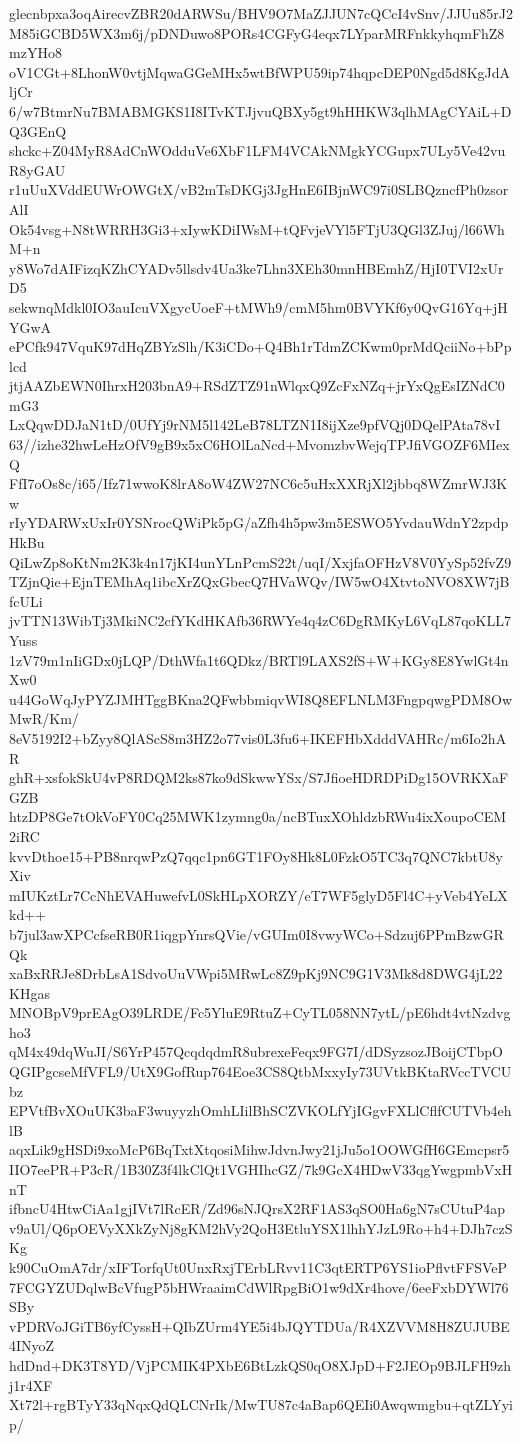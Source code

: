 glecnbpxa3oqAirecvZBR20dARWSu/BHV9O7MaZJJUN7cQCcI4vSnv/JJUu85rJ2
M85iGCBD5WX3m6j/pDNDuwo8PORs4CGFyG4eqx7LYparMRFnkkyhqmFhZ8mzYHo8
oV1CGt+8LhonW0vtjMqwaGGeMHx5wtBfWPU59ip74hqpcDEP0Ngd5d8KgJdAljCr
6/w7BtmrNu7BMABMGKS1I8ITvKTJjvuQBXy5gt9hHHKW3qlhMAgCYAiL+DQ3GEnQ
shckc+Z04MyR8AdCnWOdduVe6XbF1LFM4VCAkNMgkYCGupx7ULy5Ve42vuR8yGAU
r1uUuXVddEUWrOWGtX/vB2mTsDKGj3JgHnE6IBjnWC97i0SLBQzncfPh0zsorAlI
Ok54vsg+N8tWRRH3Gi3+xIywKDiIWsM+tQFvjeVYl5FTjU3QGl3ZJuj/l66WhM+n
y8Wo7dAIFizqKZhCYADv5llsdv4Ua3ke7Lhn3XEh30mnHBEmhZ/HjI0TVI2xUrD5
sekwnqMdkl0IO3auIcuVXgycUoeF+tMWh9/cmM5hm0BVYKf6y0QvG16Yq+jHYGwA
ePCfk947VquK97dHqZBYzSlh/K3iCDo+Q4Bh1rTdmZCKwm0prMdQciiNo+bPplcd
jtjAAZbEWN0IhrxH203bnA9+RSdZTZ91nWlqxQ9ZcFxNZq+jrYxQgEsIZNdC0mG3
LxQqwDDJaN1tD/0UfYj9rNM5l142LeB78LTZN1I8ijXze9pfVQj0DQelPAta78vI
63//izhe32hwLeHzOfV9gB9x5xC6HOlLaNcd+MvomzbvWejqTPJfiVGOZF6MIexQ
FfI7oOs8c/i65/Ifz71wwoK8lrA8oW4ZW27NC6c5uHxXXRjXl2jbbq8WZmrWJ3Kw
rIyYDARWxUxIr0YSNrocQWiPk5pG/aZfh4h5pw3m5ESWO5YvdauWdnY2zpdpHkBu
QiLwZp8oKtNm2K3k4n17jKI4unYLnPcmS22t/uqI/XxjfaOFHzV8V0YySp52fvZ9
TZjnQie+EjnTEMhAq1ibcXrZQxGbecQ7HVaWQv/IW5wO4XtvtoNVO8XW7jBfcULi
jvTTN13WibTj3MkiNC2cfYKdHKAfb36RWYe4q4zC6DgRMKyL6VqL87qoKLL7Yuss
1zV79m1nIiGDx0jLQP/DthWfa1t6QDkz/BRTl9LAXS2fS+W+KGy8E8YwlGt4nXw0
u44GoWqJyPYZJMHTggBKna2QFwbbmiqvWI8Q8EFLNLM3FngpqwgPDM8OwMwR/Km/
8eV5192I2+bZyy8QlAScS8m3HZ2o77vis0L3fu6+IKEFHbXdddVAHRc/m6Io2hAR
ghR+xsfokSkU4vP8RDQM2ks87ko9dSkwwYSx/S7JfioeHDRDPiDg15OVRKXaFGZB
htzDP8Ge7tOkVoFY0Cq25MWK1zymng0a/ncBTuxXOhldzbRWu4ixXoupoCEM2iRC
kvvDthoe15+PB8nrqwPzQ7qqc1pn6GT1FOy8Hk8L0FzkO5TC3q7QNC7kbtU8yXiv
mIUKztLr7CcNhEVAHuwefvL0SkHLpXORZY/eT7WF5glyD5Fl4C+yVeb4YeLXkd++
b7jul3awXPCcfseRB0R1iqgpYnrsQVie/vGUIm0I8vwyWCo+Sdzuj6PPmBzwGRQk
xaBxRRJe8DrbLsA1SdvoUuVWpi5MRwLc8Z9pKj9NC9G1V3Mk8d8DWG4jL22KHgas
MNOBpV9prEAgO39LRDE/Fc5YluE9RtuZ+CyTL058NN7ytL/pE6hdt4vtNzdvgho3
qM4x49dqWuJI/S6YrP457QcqdqdmR8ubrexeFeqx9FG7I/dDSyzsozJBoijCTbpO
QGIPgcseMfVFL9/UtX9GofRup764Eoe3CS8QtbMxxyIy73UVtkBKtaRVccTVCUbz
EPVtfBvXOuUK3baF3wuyyzhOmhLIilBhSCZVKOLfYjIGgvFXLlCflfCUTVb4ehlB
aqxLik9gHSDi9xoMcP6BqTxtXtqosiMihwJdvnJwy21jJu5o1OOWGfH6GEmcpsr5
IIO7eePR+P3cR/1B30Z3f4lkClQt1VGHIhcGZ/7k9GcX4HDwV33qgYwgpmbVxHnT
ifbncU4HtwCiAa1gjIVt7lRcER/Zd96sNJQrsX2RF1AS3qSO0Ha6gN7sCUtuP4ap
v9aUl/Q6pOEVyXXkZyNj8gKM2hVy2QoH3EtluYSX1lhhYJzL9Ro+h4+DJh7czSKg
k90CuOmA7dr/xIFTorfqUt0UnxRxjTErbLRvv11C3qtERTP6YS1ioPflvtFFSVeP
7FCGYZUDqlwBcVfugP5bHWraaimCdWlRpgBiO1w9dXr4hove/6eeFxbDYWl76SBy
vPDRVoJGiTB6yfCyssH+QIbZUrm4YE5i4bJQYTDUa/R4XZVVM8H8ZUJUBE4INyoZ
hdDnd+DK3T8YD/VjPCMIK4PXbE6BtLzkQS0qO8XJpD+F2JEOp9BJLFH9zhj1r4XF
Xt72l+rgBTyY33qNqxQdQLCNrIk/MwTU87c4aBap6QEIi0Awqwmgbu+qtZLYyip/
